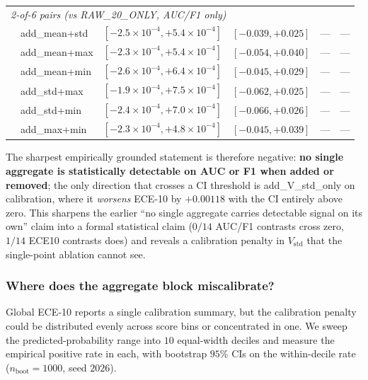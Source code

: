 \documentclass{article}
\begin{document}
\begin{table}[t]
\begin{tabular}{llcccc}
\midrule
\multicolumn{6}{l}{\emph{2-of-6 pairs (vs RAW\_20\_ONLY, AUC/F1 only)}} \\
& add\_mean+std & $[-2.5\!\times\!10^{-4}, +5.4\!\times\!10^{-4}]$ & $[-0.039, +0.025]$ & --- & --- \\
& add\_mean+max & $[-2.3\!\times\!10^{-4}, +5.4\!\times\!10^{-4}]$ & $[-0.054, +0.040]$ & --- & --- \\
& add\_mean+min & $[-2.6\!\times\!10^{-4}, +6.4\!\times\!10^{-4}]$ & $[-0.045, +0.029]$ & --- & --- \\
& add\_std+max  & $[-1.9\!\times\!10^{-4}, +7.5\!\times\!10^{-4}]$ & $[-0.062, +0.025]$ & --- & --- \\
& add\_std+min  & $[-2.4\!\times\!10^{-4}, +7.0\!\times\!10^{-4}]$ & $[-0.066, +0.026]$ & --- & --- \\
& add\_max+min  & $[-2.3\!\times\!10^{-4}, +4.8\!\times\!10^{-4}]$ & $[-0.045, +0.039]$ & --- & --- \\
\bottomrule
\end{tabular}
\end{table}

The sharpest empirically grounded statement is therefore negative:
\textbf{no single aggregate is statistically detectable on AUC or F1
when added or removed}; the only direction that crosses a CI
threshold is \textsf{add\_V\_std\_only} on calibration, where it
\emph{worsens} ECE-10 by $+0.00118$ with the CI entirely above zero.
This sharpens the earlier ``no single aggregate carries detectable
signal on its own'' claim into a formal statistical claim
($0/14$ AUC/F1 contrasts cross zero, $1/14$ ECE10 contrasts does)
and reveals a calibration penalty in $V_{\text{std}}$ that the single-point
ablation cannot see.

\subsubsection{Where does the aggregate block miscalibrate?}

Global ECE-10 reports a single calibration summary, but the
calibration penalty could be distributed evenly across score bins
or concentrated in one. We sweep the predicted-probability range
into $10$ equal-width deciles and measure the empirical positive
rate in each, with bootstrap $95$\% CIs on the within-decile rate
($n_{\text{boot}}{=}1000$, seed $2026$).
\end{document}

